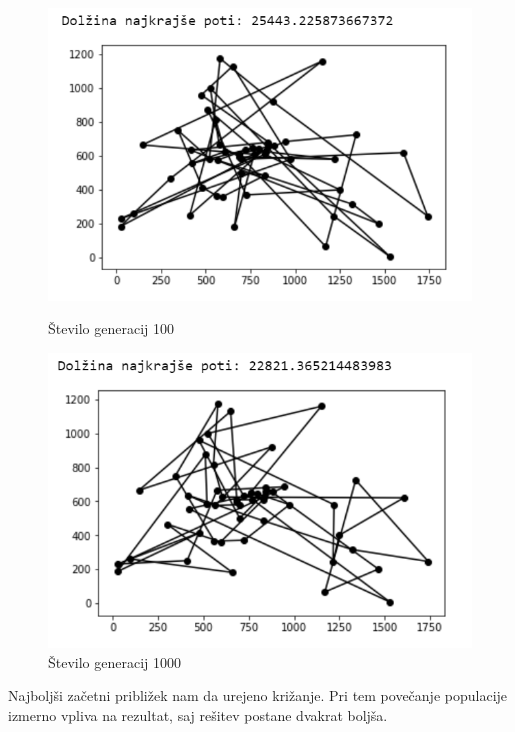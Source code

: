 \documentclass[12pt,a4paper]{amsart}
\theoremstyle{definition} %
\theoremstyle{plain} %
\begin{document}
\begin{figure}[h!]
\begin{minipage}[t]{0.48\textwidth}
\includegraphics[width=\linewidth,keepaspectratio=true]{primer-pop1}
\caption{Število generacij 100}
\label{gem1}
\end{minipage}
\hspace*{\fill} %
\begin{minipage}[t]{0.48\textwidth}
\includegraphics[width=\linewidth,keepaspectratio=true]{primer-pop-gen3}
\caption{Število generacij 1000}
\label{gen2}
\end{minipage}
\end{figure}
\newpage
Najboljši začetni približek nam da urejeno križanje. Pri tem povečanje populacije izmerno vpliva na rezultat, saj rešitev postane dvakrat boljša. 
\end{document}
